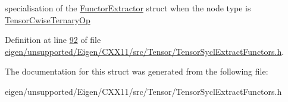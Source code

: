 specialisation of the \hyperlink{struct_eigen_1_1_tensor_sycl_1_1internal_1_1_functor_extractor}{Functor\+Extractor} struct when the node type is \hyperlink{class_eigen_1_1_tensor_cwise_ternary_op}{Tensor\+Cwise\+Ternary\+Op} 

Definition at line \hyperlink{eigen_2unsupported_2_eigen_2_c_x_x11_2src_2_tensor_2_tensor_sycl_extract_functors_8h_source_l00092}{92} of file \hyperlink{eigen_2unsupported_2_eigen_2_c_x_x11_2src_2_tensor_2_tensor_sycl_extract_functors_8h_source}{eigen/unsupported/\+Eigen/\+C\+X\+X11/src/\+Tensor/\+Tensor\+Sycl\+Extract\+Functors.\+h}.



The documentation for this struct was generated from the following file\+:\begin{DoxyCompactItemize}
\item 
eigen/unsupported/\+Eigen/\+C\+X\+X11/src/\+Tensor/\+Tensor\+Sycl\+Extract\+Functors.\+h\end{DoxyCompactItemize}
